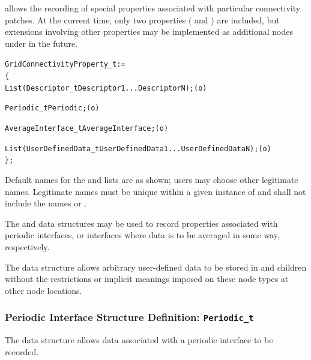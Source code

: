  allows the recording of special
properties associated with particular connectivity patches.
At the current time, only two properties ( and
) are included, but extensions involving
other properties may be implemented as additional nodes under
 in the future.

\begin{alltt}
  GridConnectivityProperty\_t :=
    \{
    List( Descriptor\_t Descriptor1 ... DescriptorN ) ;                      (o)

    Periodic\_t Periodic ;                                                   (o)

    AverageInterface\_t AverageInterface ;                                   (o)

    List( UserDefinedData\_t UserDefinedData1 ... UserDefinedDataN ) ;       (o)
    \} ;
\end{alltt}

\begin{notes}
\item
 Default names for the  and
 lists are as shown; users may choose other legitimate names.
 Legitimate names must be unique within a given instance of
  and shall not include the names
  or .
\end{notes}

The  and  data structures
may be used to record properties associated with periodic interfaces, or
interfaces where data is to be averaged in some way, respectively.

The  data structure allows arbitrary
user-defined data to be stored in  and
 children without the restrictions or implicit
meanings imposed on these node types at other node locations.

\subsubsection{Periodic Interface Structure Definition: \texttt{Periodic\_t}}
\label{s:Periodic}

The  data structure allows data associated with
a periodic interface to be recorded.

